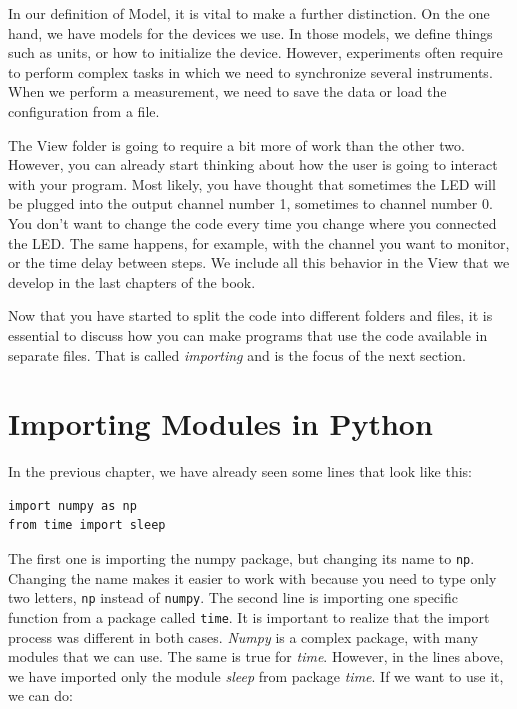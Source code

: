 In our definition of Model, it is vital to make a further distinction. On the one hand, we have models for the devices we use. In those models, we define things such as units, or how to initialize the device. However, experiments often require to perform complex tasks in which we need to synchronize several instruments. When we perform a measurement, we need to save the data or load the configuration from a file.


The View folder is going to require a bit more of work than the other two. However, you can already start thinking about how the user is going to interact with your program. Most likely, you have thought that sometimes the {LED} will be plugged into the output channel number 1, sometimes to channel number 0. You don't want to change the code every time you change where you connected the LED. The same happens, for example, with the channel you want to monitor, or the time delay between steps. We include all this behavior in the View that we develop in the last chapters of the book.

Now that you have started to split the code into different folders and files, it is essential to discuss how you can make programs that use the code available in separate files. That is called \emph{importing} and is the focus of the next section.

\section{Importing Modules in Python}\label{sec:importing-python}
In the previous chapter, we have already seen some lines that look like this:

\begin{verbatim}
import numpy as np
from time import sleep
\end{verbatim}

The first one is importing the numpy package, but changing its name to \texttt{np}. Changing the name makes it easier to work with because you need to type only two letters, \texttt{np} instead of \texttt{numpy}. The second line is importing one specific function from a package called \texttt{time}. It is important to realize that the import process was different in both cases. \emph{Numpy} is a complex package, with many modules that we can use. The same is true for \emph{time}. However, in the lines above, we have imported only the module \emph{sleep} from package \emph{time}. If we want to use it, we can do:

